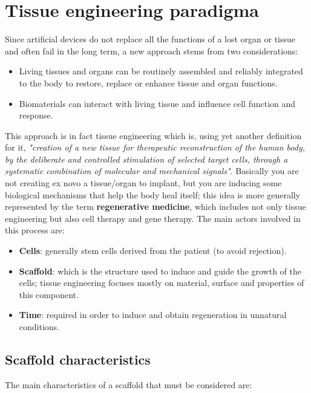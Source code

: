 \section{Tissue engineering paradigma}
Since artificial devices do not replace all the functions of a lost organ or tissue and often fail in the long term, a new approach stems from two considerations:

\begin{multicols}{2}
  \begin{itemize}
    \item Living tissues and organs can be routinely assembled and reliably integrated to the body to restore, replace or enhance tissue and organ functions.
    \item Biomaterials can interact with living tissue and influence cell function and response.
  \end{itemize}
\end{multicols}

This approach is in fact tissue engineering which is, using yet another definition for it, \textit{"creation of a new tissue for therapeutic reconstruction of the human body, by the deliberate and controlled stimulation of selected target cells, through a systematic combination of molecular and mechanical signals"}.
Basically you are not creating ex novo a tissue/organ to implant, but you are inducing some biological mechanisms that help the body heal itself; this idea is more generally represented by the term \textbf{regenerative medicine}, which includes not only tissue engineering but also cell therapy and gene therapy.
The main actors involved in this process are:

\begin{multicols}{2}
  \begin{itemize}
    \item \textbf{Cells}: generally stem cells derived from the patient (to avoid rejection).
    \item \textbf{Scaffold}: which is the structure used to induce and guide the growth of the cells; tissue engineering focuses mostly on material, surface and properties of this component.
    \item \textbf{Time}: required in order to induce and obtain regeneration in unnatural conditions.
  \end{itemize}
\end{multicols}

  \subsection{Scaffold characteristics}
  The main characteristics of a scaffold that must be considered are:

